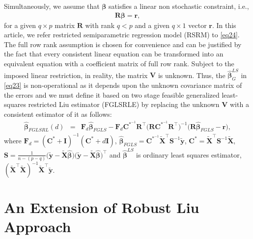 \documentclass[twoside]{article}
\begin{document}
Simultaneously, we assume that $\boldsymbol\beta$ satisfies a linear non stochastic constraint, i.e.,
\begin{eqnarray}\label{eq24}
\boldsymbol R\boldsymbol\beta=\boldsymbol r,
\end{eqnarray}
for a given $q\times p$ matrix $\boldsymbol R$ with rank $q<p$ and a given $q\times1$ vector $\boldsymbol r$. In this article, we refer restricted semiparametric regression model (RSRM) to \eqref{eq24}. The full row rank assumption is chosen for convenience and can be justified by the fact that every
consistent linear equation can be transformed into an equivalent equation with a coefficient matrix of full row rank. Subject
to the imposed linear restriction, in reality, the matrix $\boldsymbol V$ is unknown. Thus, the $\hat{\boldsymbol\beta}_G^{LS}$ in \eqref{eq23} is non-operational as it depends upon the unknown covariance matrix of the errors and we must define it based on two stage feasible generalized least-squares restricted Liu estimator (FGLSRLE) by replacing the unknown $\boldsymbol V$ with a consistent
estimator of it as follows:
\begin{eqnarray}\label{eq25}
\hat{\boldsymbol\beta}_{FGLSRL}(d)&=&\boldsymbol F_d\hat{\boldsymbol\beta}_{FGLS}-\boldsymbol F_d\boldsymbol C^{*^{-1}}\boldsymbol R^\top\big(\boldsymbol R\boldsymbol C^{*^{-1}}\boldsymbol R^{\top}\big)^{-1}\big(\boldsymbol R\hat{\boldsymbol\beta}_{FGLS}-\boldsymbol r\big),
\end{eqnarray}
where $\boldsymbol F_d=(\boldsymbol C^{*}+\boldsymbol I)^{-1}(\boldsymbol C^{*}+d\boldsymbol I)$, $\hat{\boldsymbol\beta}_{FGLS}=\boldsymbol C^{*^{-1}}\widetilde{\boldsymbol X}^\top\boldsymbol S^{-1}\widetilde{\boldsymbol y}$,
$\boldsymbol C^*=\widetilde{\boldsymbol X}^\top\boldsymbol S^{-1}\widetilde{\boldsymbol X}$, $\boldsymbol S=\frac{1}{n-(p-q)}\big(\widetilde{\boldsymbol y}-\widetilde{\boldsymbol X}\hat{\boldsymbol\beta}\big)\big(\widetilde{\boldsymbol y}-\widetilde{\boldsymbol X} \hat{\boldsymbol\beta}\big)^\top$ and $\hat{\boldsymbol\beta}^{LS}$ is ordinary least squares estimator, $(\widetilde{\boldsymbol X}^\top\widetilde{\boldsymbol X})^{-1}\widetilde{\boldsymbol X}^\top\widetilde{\boldsymbol y}$.


\section{An Extension of Robust Liu Approach}
\end{document}
